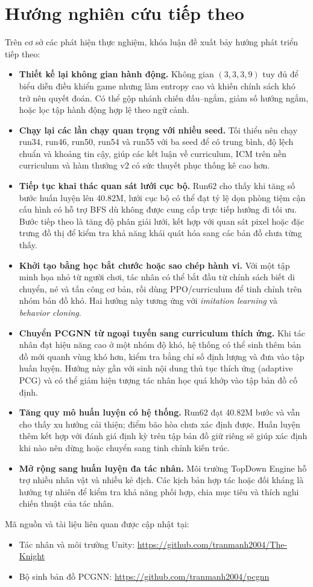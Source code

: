 \section{Hướng nghiên cứu tiếp theo}

Trên cơ sở các phát hiện thực nghiệm, khóa luận đề xuất bảy hướng phát triển tiếp theo:

\begin{itemize}
    \item \textbf{Thiết kế lại không gian hành động.} Không gian $(3,3,3,9)$ tuy đủ để biểu diễn điều khiển game nhưng làm entropy cao và khiến chính sách khó trở nên quyết đoán. Có thể gộp nhánh chiến đấu--ngắm, giảm số hướng ngắm, hoặc lọc tập hành động hợp lệ theo ngữ cảnh.

    \item \textbf{Chạy lại các lần chạy quan trọng với nhiều seed.} Tối thiểu nên chạy run34, run46, run50, run54 và run55 với ba seed để có trung bình, độ lệch chuẩn và khoảng tin cậy, giúp các kết luận về curriculum, ICM trên nền curriculum và hàm thưởng v2 có sức thuyết phục thống kê cao hơn.

    \item \textbf{Tiếp tục khai thác quan sát lưới cục bộ.} Run62 cho thấy khi tăng số bước huấn luyện lên 40.82M, lưới cục bộ có thể đạt tỷ lệ dọn phòng tiệm cận cấu hình có hỗ trợ BFS dù không được cung cấp trực tiếp hướng đi tối ưu. Bước tiếp theo là tăng độ phân giải lưới, kết hợp với quan sát pixel hoặc đặc trưng đồ thị để kiểm tra khả năng khái quát hóa sang các bản đồ chưa từng thấy.

    \item \textbf{Khởi tạo bằng học bắt chước hoặc sao chép hành vi.} Với một tập minh họa nhỏ từ người chơi, tác nhân có thể bắt đầu từ chính sách biết di chuyển, né và tấn công cơ bản, rồi dùng PPO/curriculum để tinh chỉnh trên nhóm bản đồ khó. Hai hướng này tương ứng với \emph{imitation learning} và \emph{behavior cloning}.

    \item \textbf{Chuyển PCGNN từ ngoại tuyến sang curriculum thích ứng.} Khi tác nhân đạt hiệu năng cao ở một nhóm độ khó, hệ thống có thể sinh thêm bản đồ mới quanh vùng khó hơn, kiểm tra bằng chỉ số định lượng và đưa vào tập huấn luyện. Hướng này gần với sinh nội dung thủ tục thích ứng (adaptive PCG) và có thể giảm hiện tượng tác nhân học quá khớp vào tập bản đồ cố định.

    \item \textbf{Tăng quy mô huấn luyện có hệ thống.} Run62 đạt 40.82M bước và vẫn cho thấy xu hướng cải thiện; điểm bão hòa chưa xác định được. Huấn luyện thêm kết hợp với đánh giá định kỳ trên tập bản đồ giữ riêng sẽ giúp xác định khi nào nên dừng hoặc chuyển sang tinh chỉnh kiến trúc.

    \item \textbf{Mở rộng sang huấn luyện đa tác nhân.} Môi trường TopDown Engine hỗ trợ nhiều nhân vật và nhiều kẻ địch. Các kịch bản hợp tác hoặc đối kháng là hướng tự nhiên để kiểm tra khả năng phối hợp, chia mục tiêu và thích nghi chiến thuật của tác nhân.
\end{itemize}

Mã nguồn và tài liệu liên quan được cập nhật tại:
\begin{itemize}
    \item Tác nhân và môi trường Unity: \url{https://github.com/tranmanh2004/The-Knight}
    \item Bộ sinh bản đồ PCGNN: \url{https://github.com/tranmanh2004/pcgnn}
\end{itemize}
